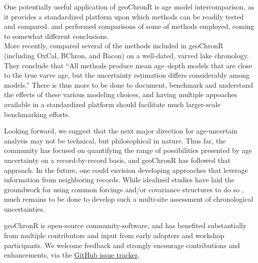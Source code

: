 \documentclass[gchron, manuscript]{copernicus}
\begin{document}
One potentially useful application of geoChronR is age model
intercomparison, as it provides a standardized platform upon which
methods can be readily tested and compared. \citet{Scholz_QG2012} and
\citet{Parnell_QSR2011} performed comparisons of some of methods
employed, coming to somewhat different conclusions.\\
More recently, \citet{trachsel2017} compared several of the methods
included in geoChronR (including OxCal, BChron, and Bacon) on a
well-dated, varved lake chronology. They conclude that ``All methods
produce mean age--depth models that are close to the true varve age, but
the uncertainty estimation differs considerably among models.'' There is
thus more to be done to document, benchmark and understand the effects
of these various modeling choices, and having multiple appoaches
available in a standardized platform should facilitate much larger-scale
benchmarking efforts.

Looking forward, we suggest that the next major direction for
age-uncertain analysis may not be technical, but philosophical in
nature. Thus far, the community has focused on quantifying the range of
possibilities presented by age uncertainty on a record-by-record basis,
and geoChronR has followed that approach. In the future, one could
envision developing approaches that leverage information from
neighboring records. While idealized studies have laid the groundwork
for using common forcings and/or covariance structures to do so
\citep{wernerTingley2015}, much remains to be done to develop such a
multi-site assessment of chronological uncertainties.

geoChronR is open-source community-software, and has benefited
substantially from multiple contributors and input from early adopters
and workshop participants. We welcome feedback and strongly encourage
contributions and enhancements, via the
\href{https://github.com/nickmckay/geoChronR/issues}{GitHub issue
tracker}.



\end{document}
